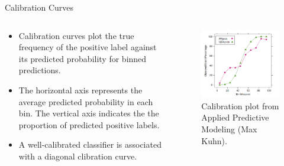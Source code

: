\documentclass[11pt,compress,t,notes=noshow, aspectratio=169, xcolor=table]{beamer}
\begin{document}
\begin{frame}{Calibration Curves}

\begin{columns}

\begin{column}{0.5\textwidth}
\begin{itemize}
\setlength\itemsep{2em}
    \item Calibration curves plot the true frequency of the positive label against its predicted probability for binned predictions.
    \item The horizontal axis represents the average predicted probability in each bin. The vertical axis indicates the the proportion of predicted positive labels.
    \item A well-calibrated classifier is associated with a diagonal clibration curve.
\end{itemize}
\end{column}
\begin{column}{0.5\textwidth}
\begin{figure}
    \centering
    \includegraphics{figure/calibration_plot.png}
    \caption{Calibration plot from Applied Predictive Modeling (Max Kuhn).}
\end{figure}
\end{column}
\end{columns}

\end{frame}



\endlecture
\end{document}
